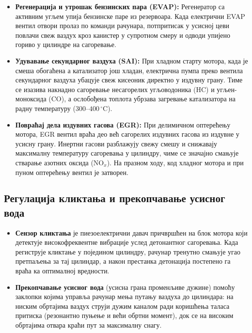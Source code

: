 \documentclass[12pt]{article}
\begin{document}
\begin{itemize}[noitemsep]
    \item \textbf{Регенерација и утрошак бензинских пара (EVAP):} Регенератор
          са активним угљем упија бензинске паре из резервоара. Када
          електрични EVAP вентил отвори пролаз по команди рачунара,
          потпритисак у усисној цеви повлачи свеж ваздух кроз канистер у
          супротном смеру и одводи упијено гориво у цилиндре на сагоревање.
    \item \textbf{Удувавање секундарног ваздуха (SAI):} При хладном старту
          мотора, када је смеша обогаћена а катализатор још хладан, електрична
          пумпа преко вентила секундарног ваздуха убацује свеж кисеоник
          директно у издувну грану. Тиме се изазива накнадно сагоревање
          несагорелих угљоводоника ($\text{HC}$) и угљен-моноксида
          ($\text{CO}$), а ослобођена топлота убрзава загревање катализатора на
          радну температуру ($300\text{--}400\,^\circ\text{C}$).
    \item \textbf{Повраћај дела издувних гасова (EGR):} При делимичном
          оптерећењу мотора, EGR вентил враћа део већ сагорелих издувних гасова
          из издувне у усисну грану. Инертни гасови разблажују свежу смешу и
          снижавају максималну температуру сагоревања у цилиндру, чиме се
          значајно смањује стварање азотних оксида ($\text{NO}_x$). На празном
          ходу, код хладног мотора и при пуном оптерећењу вентил је затворен.
\end{itemize}

\subsection{Регулација кликтања и прекопчавање усисног вода}

\begin{itemize}[noitemsep]
    \item \textbf{Сензор кликтања} је пиезоелектрични давач причвршћен на блок
          мотора који детектује високофреквентне вибрације услед детонантног
          сагоревања. Када региструје кликтање у поједином цилиндру, рачунар
          тренутно смањује угао претпаљења за тај цилиндар, а након престанка
          детонација постепено га враћа ка оптималној вредности.
    \item \textbf{Прекопчавање усисног вода} (усисна грана променљиве дужине)
          помоћу заклопки којима управља рачунар мења путању ваздуха до
          цилиндара: на ниским обртајима ваздух струји дужим каналом ради
          коришћења таласа притиска (резонантно пуњење и већи обртни момент),
          док се на високим обртајима отвара краћи пут за максималну снагу.
\end{itemize}
\end{document}
